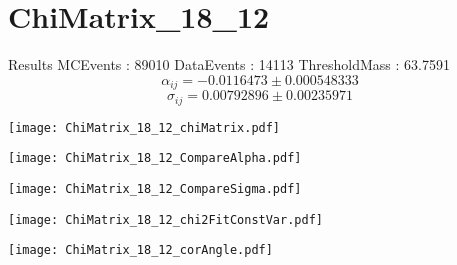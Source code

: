 \documentclass[a4paper,12pt]{article}
\begin{document}
\section{ChiMatrix\_18\_12}
\begin{minipage}{0.49\linewidth} Results \newline
MCEvents : 89010\newline
DataEvents : 14113 \newline
ThresholdMass : 63.7591\\
$$\alpha_{ij} = -0.0116473\pm 0.000548333$$
$$\sigma_{ij} = 0.00792896\pm 0.00235971$$
\end{minipage}\hfill
\begin{minipage}{0.49\linewidth} 
\texttt{[image: ChiMatrix\_18\_12\_chiMatrix.pdf]}\\
\end{minipage}
\hfill
\begin{minipage}{0.49\linewidth} 
\texttt{[image: ChiMatrix\_18\_12\_CompareAlpha.pdf]}\\
\end{minipage}
\hfill
\begin{minipage}{0.49\linewidth} 
\texttt{[image: ChiMatrix\_18\_12\_CompareSigma.pdf]}\\
\end{minipage}
\begin{minipage}{0.49\linewidth} 
\texttt{[image: ChiMatrix\_18\_12\_chi2FitConstVar.pdf]}\\
\end{minipage}
\hfill
\begin{minipage}{0.49\linewidth} 
\texttt{[image: ChiMatrix\_18\_12\_corAngle.pdf]}\\
\end{minipage}
\end{document}
